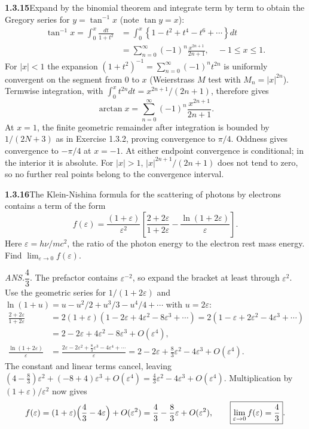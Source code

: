 \par\bigskip
\noindent\textbf{1.3.15}\quad Expand by the binomial theorem and integrate
term by term to obtain the Gregory series for $y=\tan^{-1}x$ (note $\tan
y=x$):
\[
\begin{split}
\tan^{-1}x=\int_{0}^{x}\frac{dt}{1+t^{2}}
&=\int_{0}^{x}\left\{1-t^{2}+t^{4}-t^{6}+\cdots\right\}dt\\
&=\sum_{n=0}^{\infty}(-1)^{n}\frac{x^{2n+1}}{2n+1},\quad -1\leq x\leq1.
\end{split}
\]
\solution
For $|x|<1$ the expansion
$(1+t^2)^{-1}=\sum_{n=0}^\infty(-1)^nt^{2n}$ is uniformly convergent
on the segment from $0$ to $x$ (Weierstrass $M$ test with
$M_n=|x|^{2n}$). Termwise integration, with
$\int_0^xt^{2n}dt=x^{2n+1}/(2n+1)$, therefore gives
\[
 \arctan x=\sum_{n=0}^\infty(-1)^n\frac{x^{2n+1}}{2n+1}.
\]
At $x=1$, the finite geometric remainder after integration is bounded
by $1/(2N+3)$ as in Exercise 1.3.2, proving convergence to $\pi/4$.
Oddness gives convergence to $-\pi/4$ at $x=-1$. At either endpoint
convergence is conditional; in the interior it is absolute. For
$|x|>1$, $|x|^{2n+1}/(2n+1)$ does not tend to zero, so no further
real points belong to the convergence interval.


\par\bigskip
\noindent\textbf{1.3.16}\quad The Klein-Nishina formula for the scattering of
photons by electrons contains a term of the form
\[
f(\varepsilon)=\frac{(1+\varepsilon)}{\varepsilon^{2}}
\left[\frac{2+2\varepsilon}{1+2\varepsilon}-\frac{\ln(1+2\varepsilon)}
{\varepsilon}\right].
\]
Here $\varepsilon=h\nu/mc^{2}$, the ratio of the photon energy to the electron
rest mass energy. Find $\displaystyle\lim_{\varepsilon\to0}f(\varepsilon)$.
\par\nobreak\hfill\emph{ANS.}\enspace $\dfrac{4}{3}$.
\solution
The prefactor contains $\varepsilon^{-2}$, so expand the bracket at
least through $\varepsilon^2$. Use the geometric series for
$1/(1+2\varepsilon)$ and $\ln(1+u)=u-u^2/2+u^3/3-u^4/4+\cdots$ with
$u=2\varepsilon$:
\[
 \begin{aligned}
 \frac{2+2\varepsilon}{1+2\varepsilon}
 &=2(1+\varepsilon)(1-2\varepsilon+4\varepsilon^2-8\varepsilon^3+\cdots)
  =2(1-\varepsilon+2\varepsilon^2-4\varepsilon^3+\cdots)\\
 &=2-2\varepsilon+4\varepsilon^2-8\varepsilon^3+O(\varepsilon^4),\\
 \frac{\ln(1+2\varepsilon)}{\varepsilon}
 &=\frac{2\varepsilon-2\varepsilon^2+\frac83\varepsilon^3
   -4\varepsilon^4+\cdots}{\varepsilon}
 =2-2\varepsilon+\frac83\varepsilon^2-4\varepsilon^3+O(\varepsilon^4).
 \end{aligned}
\]
The constant and linear terms cancel, leaving
$(4-\frac83)\varepsilon^2+(-8+4)\varepsilon^3+O(\varepsilon^4)
=\frac43\varepsilon^2-4\varepsilon^3+O(\varepsilon^4)$.
Multiplication by $(1+\varepsilon)/\varepsilon^2$ now gives
\[
 f(\varepsilon)=(1+\varepsilon)\Bigl(\frac43-4\varepsilon\Bigr)+O(\varepsilon^2)
 =\frac43-\frac83\varepsilon+O(\varepsilon^2),
 \qquad \boxed{\lim_{\varepsilon\to0}f(\varepsilon)=\frac43}.
\]


